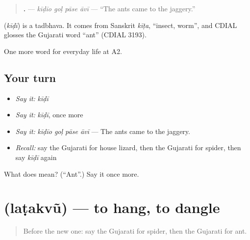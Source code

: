 \begin{quote}
\textbf{   .} — \emph{kīḍīo goḷ pāse āvī} — \textquotedblleft{}The ants came to the jaggery.\textquotedblright{}
\end{quote}

\begin{cousinweb}
\textbf{} (\emph{kīḍī}) is a tadbhava. It comes from Sanskrit \emph{kīṭa}, \textquotedblleft{}insect, worm\textquotedblright{}, and CDIAL glosses the Gujarati word \textquotedblleft{}ant\textquotedblright{} (CDIAL 3193).
\end{cousinweb}

\begin{grammarlens}[title={What you've built}]
One more word for everyday life at A2.
\end{grammarlens}

\subsection*{Your turn}
\begin{itemize}
\raggedright
  \item \emph{Say it:} \emph{kīḍī}
  \item \emph{Say it:} \emph{kīḍī}, once more
  \item \emph{Say it:} \emph{kīḍīo goḷ pāse āvī} — The ants came to the jaggery.
  \item \emph{Recall:} say the Gujarati for house lizard, then the Gujarati for spider, then say \emph{kīḍī} again
\end{itemize}

\begin{tcolorbox}[breakable,colback=teal!4,colframe=teal!35!black,title={Before you move on}]
What does  mean? (\textquotedblleft{}Ant\textquotedblright{}.) Say it once more.
\end{tcolorbox}
\section[\texorpdfstring{\gu{લટકવું} (laṭakvũ)}{લટકવું (laṭakvũ)}]{ (laṭakvũ) — to hang, to dangle}

\label{lesson:GU-C238-latakvu}



\begin{quote}
Before the new one: say the Gujarati for spider, then the Gujarati for ant.
\end{quote}

